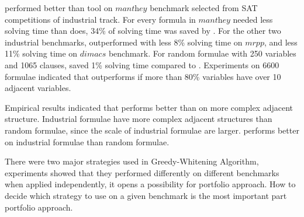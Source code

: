 \tool performed better than tool \minibones on $\textit{manthey}$  benchmark selected from SAT competitions of industrial track. For every formula in $\textit{manthey}$ \tool needed less solving time than \minibones does, 34\% of solving time was saved by \tool.
For the other two industrial benchmarks, \tool outperformed \minibones with less 8\% solving time on $\textit{mrpp}$, and less 11\% solving time on $\textit{dimacs}$ benchmark.
For random formulae with 250 variables and 1065 clauses, \tool saved 1\% solving time compared to \minibones.
Experiments on 6600 formulae indicated that \tool outperforms \minibones if more than 80\% variables have over 10 adjacent variables.

Empirical results indicated that \tool performs better than \minibones on more complex adjacent structure. Industrial formulae have more complex adjacent structures than random formulae, since the scale of industrial formulae are larger. \tool performs better on industrial formulae than random formulae.

There were two major strategies used in Greedy-Whitening Algorithm, experiments showed that they performed differently on different benchmarks when applied independently, it opens a possibility for portfolio approach. How to decide which strategy to use on a given benchmark is the most important part portfolio approach.

